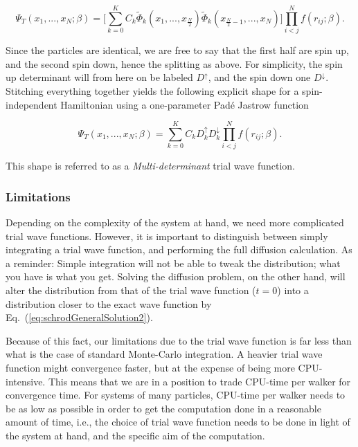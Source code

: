 \begin{equation}
 \Psi_T(x_1, ..., x_N; \beta) = \Big[\sum_{k=0}^K C_k\tilde\Phi_k(x_1, ..., x_{\frac{N}{2}})\tilde\Phi_k(x_{\frac{N}{2}-1}, ..., x_{N})\Big]\prod_{i<j}^Nf(r_{ij}; \beta).
\end{equation}

Since the particles are identical, we are free to say that the first half are spin up, and the second spin down, hence the splitting as above. For simplicity, the spin up determinant will from here on be labeled $D^\uparrow$, and the spin down one $D^\downarrow$. Stitching everything together yields the following explicit shape for a spin-independent Hamiltonian using a one-parameter Padé Jastrow function

\begin{equation}
\label{eq:MultiDeterminantTWF}
 \Psi_T(x_1, ..., x_N; \beta) = \sum_{k=0}^K C_kD^\uparrow_kD^\downarrow_k\prod_{i<j}^Nf(r_{ij}; \beta).
\end{equation}

This shape is referred to as a \textit{Multi-determinant} trial wave function. 

\subsubsection{Limitations}

Depending on the complexity of the system at hand, we need more complicated trial wave functions. However, it is important to distinguish between simply integrating a trial wave function, and performing the full diffusion calculation. As a reminder: Simple integration will not be able to tweak the distribution; what you have is what you get. Solving the diffusion problem, on the other hand, will alter the distribution from that of the trial wave function ($t = 0$) into a distribution closer to the exact wave function by Eq.~(\ref{eq:schrodGeneralSolution2}). 

Because of this fact, our limitations due to the trial wave function is far less than what is the case of standard Monte-Carlo integration. A heavier trial wave function might convergence faster, but at the expense of being more CPU-intensive. This means that we are in a position to trade CPU-time per walker for convergence time. For systems of many particles, CPU-time per walker needs to be as low as possible in order to get the computation done in a reasonable amount of time, i.e., the choice of trial wave function needs to be done in light of the system at hand, and the specific aim of the computation. 

